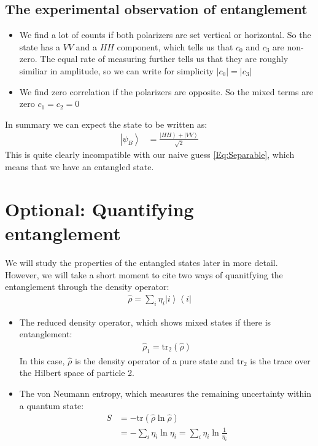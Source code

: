 \documentclass[10pt]{article}
\newcommand{\bra}[1]{\ensuremath{\left\langle#1\right|}}
\newcommand{\ket}[1]{\ensuremath{\left|#1\right\rangle}}
\newcommand{\tr}[1]{\mathrm{tr}(#1)}
\newcommand{\trarb}[2]{\mathrm{tr}_{#1}(#2)}
\begin{document}
\subsection{The experimental observation of entanglement}
\begin{itemize}
\item We find a lot of counts if both polarizers are set vertical or horizontal. So the state has a $VV$ and a $HH$ component, which tells us that $c_0$ and $c_{3}$ are non-zero. The equal rate of measuring further tells us that they are roughly similiar in amplitude, so we can write for simplicity $|c_0| = |c_3|$
\item We find zero correlation if the polarizers are opposite. So the mixed terms are zero $c_1 = c_2 = 0$
\end{itemize}
In summary we can expect the state to be written as:
\begin{align}\label{Eq:BellState}
\ket{\psi_B} &= \frac{\ket{HH} +\ket{VV}}{\sqrt{2}} 
\end{align}
This is quite clearly incompatible with our naive guess \eqref{Eq:Separable}, which means that we have an entangled state.

\section{Optional: Quantifying entanglement}
We will study the properties of the entangled states later in more detail. However, we will take a short moment to cite two ways of quanitfying the entanglement through the density operator:
\begin{align}
\hat{\rho} = \sum_i \eta_i \ket{i} \bra{i}
\end{align}
\begin{itemize}
\item The reduced density operator, which shows mixed states if there is entanglement:
\begin{align}
\hat{\rho}_1 = \trarb{2}{\hat{\rho}}
\end{align}
In this case, $\hat{\rho}$ is the density operator of a pure state and $\textrm{tr}_2$ is the trace over the Hilbert space of particle \num{2}. 
\item The von Neumann entropy, which measures the remaining uncertainty within a quantum state:
\begin{align}
S&=-\tr{\hat{\rho}\ln\hat{\rho}}\\
 &= - \sum_i \eta_i \ln \eta_i = \sum_i \eta_i \ln \frac{1}{\eta_i}
\end{align}
\end{itemize}
\end{document}
